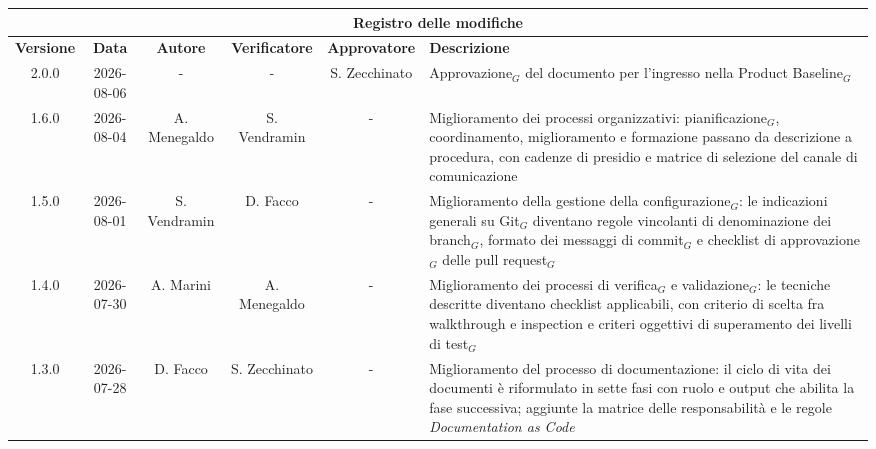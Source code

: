 \documentclass[a4paper, 10pt]{article}
\begin{document}
\newcommand{\titolo}{Norme di Progetto}
\newcommand{\dataverbale}{}
\newcommand{\dataversione}{2026-08-06}
\newcommand{\versione}{2.0.0}
\newcommand{\stato}{Approvato}
\newcommand{\destinatari}{The Bitless, prof. Tullio Vardanega, prof. Riccardo Cardin}
\def\templatedir{../../../templates}

\begin{titlepage}

\end{titlepage}

\newpage
{}

\begingroup
\small
\begin{longtable}{|c|c|c|c|c|p{3cm}|}
    \hline
    \multicolumn{6}{|c|}{\textbf{Registro delle modifiche}} \\
    \hline
    \textbf{Versione} & \textbf{Data} & \textbf{Autore} & \textbf{Verificatore} & \textbf{Approvatore} & \textbf{Descrizione} \\
    \hline
    \endhead
    2.0.0 & 2026-08-06 & - & - & S. Zecchinato & Approvazione$_G$ del documento per l'ingresso nella Product Baseline$_G$ \\ \hline

    1.6.0 & 2026-08-04 & A. Menegaldo & S. Vendramin & - & Miglioramento dei processi organizzativi: pianificazione$_G$, coordinamento, miglioramento e formazione passano da descrizione a procedura, con cadenze di presidio e matrice di selezione del canale di comunicazione \\ \hline

    1.5.0 & 2026-08-01 & S. Vendramin & D. Facco & - & Miglioramento della gestione della configurazione$_G$: le indicazioni generali su Git$_G$ diventano regole vincolanti di denominazione dei branch$_G$, formato dei messaggi di commit$_G$ e checklist di approvazione$_G$ delle pull request$_G$ \\ \hline

    1.4.0 & 2026-07-30 & A. Marini & A. Menegaldo & - & Miglioramento dei processi di verifica$_G$ e validazione$_G$: le tecniche descritte diventano checklist applicabili, con criterio di scelta fra walkthrough e inspection e criteri oggettivi di superamento dei livelli di test$_G$ \\ \hline

    1.3.0 & 2026-07-28 & D. Facco & S. Zecchinato & - & Miglioramento del processo di documentazione: il ciclo di vita dei documenti è riformulato in sette fasi con ruolo e output che abilita la fase successiva; aggiunte la matrice delle responsabilità e le regole \textit{Documentation as Code} \\ \hline


\end{longtable}
\end{document}
